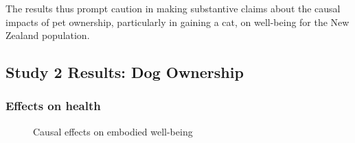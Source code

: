\documentclass[
  singlecolumn,
  9pt]{article}
\begin{document}
The results thus prompt caution in making substantive claims about the
causal impacts of pet ownership, particularly in gaining a cat, on
well-being for the New Zealand population.

\newpage{}

\subsection{Study 2 Results: Dog
Ownership}\label{study-2-results-dog-ownership}

\subsubsection{Effects on health}\label{effects-on-health-1}

\begin{figure}


\caption{\label{fig-results-health-dogs}Causal effects on embodied
well-being}

\end{figure}%

\newpage{}
\end{document}
